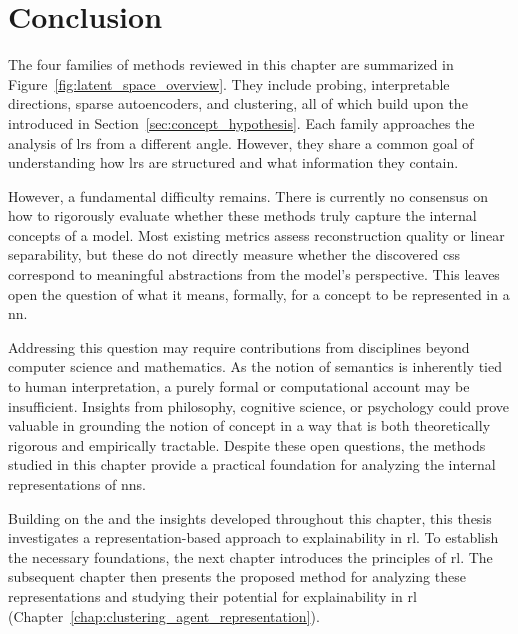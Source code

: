 \section{Conclusion}
\label{sec:latent_space_conclusion}



The four families of methods reviewed in this chapter are summarized in Figure~\ref{fig:latent_space_overview}.
They include probing, interpretable directions, sparse autoencoders, and clustering, all of which build upon the \ConceptHypothesisName introduced in Section~\ref{sec:concept_hypothesis}.
Each family approaches the analysis of \glspl{lr} from a different angle.
However, they share a common goal of understanding how \glspl{lr} are structured and what information they contain.

However, a fundamental difficulty remains.
There is currently no consensus on how to rigorously evaluate whether these methods truly capture the internal concepts of a model.
Most existing metrics assess reconstruction quality or linear separability, but these do not directly measure whether the discovered \glspl{cs} correspond to meaningful abstractions from the model's perspective.
This leaves open the question of what it means, formally, for a concept to be represented in a \gls{nn}.

Addressing this question may require contributions from disciplines beyond computer science and mathematics.
As the notion of semantics is inherently tied to human interpretation, a purely formal or computational account may be insufficient.
Insights from philosophy, cognitive science, or psychology could prove valuable in grounding the notion of concept in a way that is both theoretically rigorous and empirically tractable.
Despite these open questions, the methods studied in this chapter provide a practical foundation for analyzing the internal representations of \glspl{nn}.

Building on the \ConceptHypothesisName and the insights developed throughout this chapter, this thesis investigates a representation-based approach to explainability in \gls{rl}.
To establish the necessary foundations, the next chapter introduces the principles of \gls{rl}.
The subsequent chapter then presents the proposed method for analyzing these representations and studying their potential for explainability in \gls{rl} (Chapter~\ref{chap:clustering_agent_representation}).